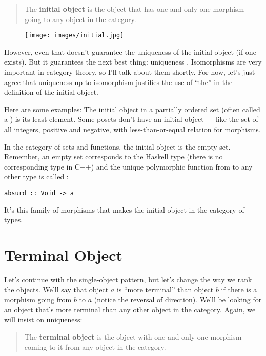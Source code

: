 \begin{quote}
The \textbf{initial object} is the object that has one and only one
morphism going to any object in the category.
\end{quote}

\begin{figure}[H]
\centering
\texttt{[image: images/initial.jpg]}
\end{figure}

\noindent
However, even that doesn't guarantee the uniqueness of the initial
object (if one exists). But it guarantees the next best thing:
uniqueness . Isomorphisms are very important in
category theory, so I'll talk about them shortly. For now, let's just
agree that uniqueness up to isomorphism justifies the use of ``the'' in
the definition of the initial object.

Here are some examples: The initial object in a partially ordered set
(often called a ) is its least element. Some posets don't
have an initial object --- like the set of all integers, positive and
negative, with less-than-or-equal relation for morphisms.

In the category of sets and functions, the initial object is the empty
set. Remember, an empty set corresponds to the Haskell type
 (there is no corresponding type in C++) and the unique
polymorphic function from  to any other type is called
:

\begin{Verbatim}
absurd :: Void -> a
\end{Verbatim}
It's this family of morphisms that makes  the initial
object in the category of types.

\section{Terminal Object}

Let's continue with the single-object pattern, but let's change the way
we rank the objects. We'll say that object $a$ is ``more terminal''
than object $b$ if there is a morphism going from $b$ to
$a$ (notice the reversal of direction). We'll be looking for an
object that's more terminal than any other object in the category.
Again, we will insist on uniqueness:

\begin{quote}
The \textbf{terminal object} is the object with one and only one
morphism coming to it from any object in the category.
\end{quote}

